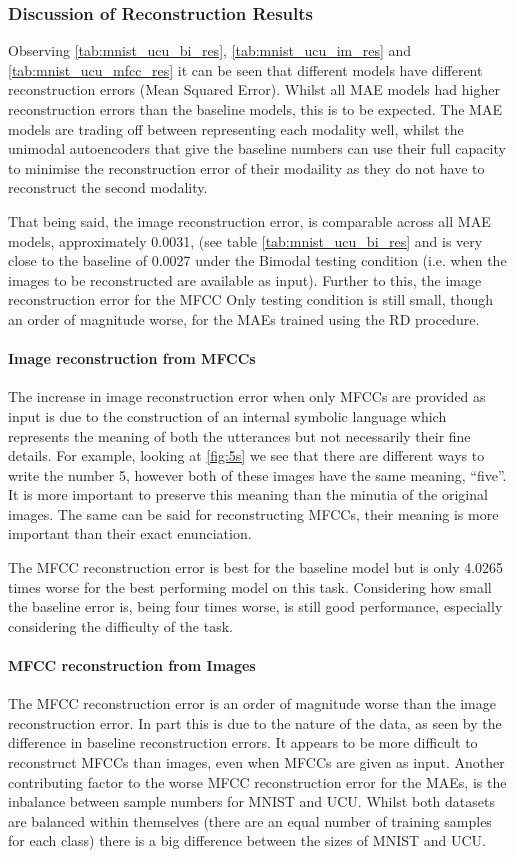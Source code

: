 \subsubsection{Discussion of Reconstruction Results}
Observing \autoref{tab:mnist_ucu_bi_res}, \autoref{tab:mnist_ucu_im_res} and \autoref{tab:mnist_ucu_mfcc_res} it can be seen that different models have different reconstruction errors (Mean Squared Error). Whilst all MAE models had higher reconstruction errors than the baseline models, this is to be expected. The MAE models are trading off between representing each modality well, whilst the unimodal autoencoders that give the baseline numbers can use their full capacity to minimise the reconstruction error of their modaility as they do not have to reconstruct the second modality. 

That being said, the image reconstruction error, is comparable across all MAE models, approximately 0.0031, (see table \autoref{tab:mnist_ucu_bi_res} and is very close to the baseline of 0.0027 under the Bimodal testing condition (i.e. when the images to be reconstructed are available as input). Further to this, the image reconstruction error for the MFCC Only testing condition is still small, though an order of magnitude worse, for the MAEs trained using the RD procedure.

\paragraph{Image reconstruction from MFCCs}
The increase in image reconstruction error when only MFCCs are provided as input is due to the construction of an internal symbolic language which represents the meaning of both the utterances but not necessarily their fine details. For example, looking at \autoref{fig:5s} we see that there are different ways to write the number 5, however both of these images have the same meaning, ``five''. It is more important to preserve this meaning than the minutia of the original images. The same can be said for reconstructing MFCCs, their meaning is more important than their exact enunciation.  

The MFCC reconstruction error is best for the baseline model but is only 4.0265 times worse for the best performing model on this task. Considering how small the baseline error is, being four times worse, is still good performance, especially considering the difficulty of the task.

\paragraph{MFCC reconstruction from Images}
The MFCC reconstruction error is an order of magnitude worse than the image reconstruction error. In part this is due to the nature of the data, as seen by the difference in baseline reconstruction errors. It appears to be more difficult to reconstruct MFCCs than images, even when MFCCs are given as input.
Another contributing factor to the worse MFCC reconstruction error for the MAEs, is the inbalance between sample numbers for MNIST and UCU. Whilst both datasets are balanced within themselves (there are an equal number of training samples for each class) there is a big difference between the sizes of MNIST and UCU. 

